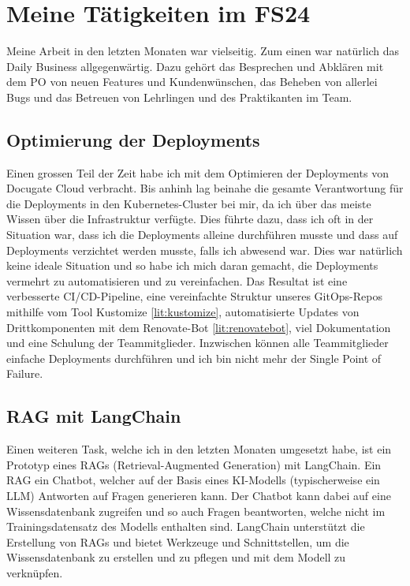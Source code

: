 \documentclass{bpraxis}
\begin{document}
\section{Meine Tätigkeiten im FS24}

Meine Arbeit in den letzten Monaten war vielseitig. Zum einen war natürlich das Daily Business allgegenwärtig. Dazu gehört das Besprechen und Abklären mit dem PO von neuen Features und Kundenwünschen,
das Beheben von allerlei Bugs und das Betreuen von Lehrlingen und des Praktikanten im Team.

\subsection{Optimierung der Deployments}

Einen grossen Teil der Zeit habe ich mit dem Optimieren der Deployments von Docugate Cloud verbracht. Bis anhinh lag beinahe die gesamte Verantwortung für die Deployments in den Kubernetes-Cluster bei mir,
da ich über das meiste Wissen über die Infrastruktur verfügte. Dies führte dazu, dass ich oft in der Situation war, dass ich die Deployments alleine durchführen musste und dass auf Deployments verzichtet werden musste,
falls ich abwesend war. Dies war natürlich keine ideale Situation und so habe ich mich daran gemacht, die Deployments vermehrt zu automatisieren und zu vereinfachen.
Das Resultat ist eine verbesserte CI/CD-Pipeline, eine vereinfachte Struktur unseres GitOps-Repos mithilfe vom Tool Kustomize \ref{lit:kustomize}, automatisierte Updates von Drittkomponenten mit dem Renovate-Bot \ref{lit:renovatebot},
viel Dokumentation und eine Schulung der Teammitglieder. Inzwischen können alle Teammitglieder einfache Deployments durchführen und ich bin nicht mehr der Single Point of Failure.

\subsection{RAG mit LangChain}

Einen weiteren Task, welche ich in den letzten Monaten umgesetzt habe, ist ein Prototyp eines RAGs (Retrieval-Augmented Generation) mit LangChain. Ein RAG ein Chatbot, welcher auf der Basis eines KI-Modells (typischerweise ein LLM)
Antworten auf Fragen generieren kann. Der Chatbot kann dabei auf eine Wissensdatenbank zugreifen und so auch Fragen beantworten, welche nicht im Trainingsdatensatz des Modells enthalten sind.
LangChain unterstützt die Erstellung von RAGs und bietet Werkzeuge und Schnittstellen, um die Wissensdatenbank zu erstellen und zu pflegen und mit dem Modell zu verknüpfen.
\end{document}
